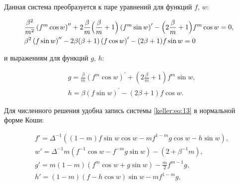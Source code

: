 Данная система преобразуется к паре уравнений для функций $f$, $w$:

\begin{equation}\label{keller:eq:14}

\begin{split}

&	\frac{\beta^2}{m^2}\left(f^m\cos w\right)^{\prime\prime}+2\frac{\beta}{m}\Bigl(\frac{\beta}{m}+1\Bigr)\left( f^m\sin w\right)^\prime-\Bigl(2\frac{\beta}{m}+1\Bigr)f^m\cos w=0,\\

&	\beta^2\left( f\sin w\right)^{\prime\prime}-2\beta(\beta+1)\left( f\cos w\right)^\prime-(2\beta+1)f\sin w=0

\end{split}

\end{equation}

и выражениям для функций $g$, $h$:

\begin{equation}\label{keller:eq:15}

\begin{split}

&	g=\frac{\beta}{m}(f^m\cos w)^\prime+(2\frac{\beta}{m}+1) f^m\sin w,\\

&	h=\beta(f\sin w)^\prime-(2\beta+1) f\cos w.

\end{split}

\end{equation}



Для численного решения удобна запись системы \eqref{keller:eq:13} в нормальной форме Коши:

\begin{equation}\label{keller:eq:16}

\begin{split}

&f' =\Delta^{-1}\left((1-m)f\sin w\cos w  - mf^{1-m}g\cos w - h\sin w \right),\\

&w'=\Delta^{-1}m\left( f^{-1}\cos w - f^{-m}g\sin w\right) - (2+\beta^{-1} m) ,\\

&g'=m(1-m)(f^m\cos w +g\sin w)-\frac{m}{2}f^{m-1}g ,\\

&h'=(1-m)(f-h\cos w)\sin w-mf^{1-m}g,

\end{split} 

\end{equation}

